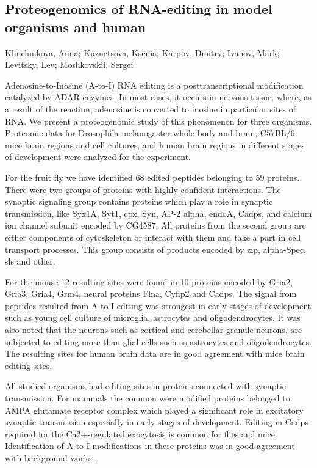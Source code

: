 {\subsection*{\color{eubicRed} Proteogenomics of RNA-editing in model organisms and human}
{\color{eubicGray}Kliuchnikova, Anna;
Kuznetsova, Ksenia;
Karpov, Dmitry;
Ivanov, Mark;
Levitsky, Lev;
Moshkovskii, Sergei}

Adenosine-to-Inosine (A-to-I) RNA editing is a posttranscriptional modification catalyzed by ADAR enzymes. In most cases, it occurs in nervous tissue, where, as a result of the reaction, adenosine is converted to inosine in particular sites of RNA. We present a proteogenomic study of this phenomenon for three organisms. Proteomic data for Drosophila melanogaster whole body and brain, C57BL/6 mice brain regions and cell cultures, and human brain regions in different stages of development were analyzed for the experiment.

For the fruit fly we have identified 68 edited peptides belonging to 59 proteins. There were two groups of proteins with highly confident interactions. The synaptic signaling group contains proteins which play a role in synaptic transmission, like Syx1A, Syt1, cpx, Syn, AP-2 alpha, endoA, Cadps, and calcium ion channel subunit encoded by CG4587. All proteins from the second group are either components of cytoskeleton or interact with them and take a part in cell transport processes. This group consists of products encoded by zip, alpha-Spec, sls and other.

For the mouse 12 resulting sites were found in 10 proteins encoded by Gria2, Gria3, Gria4, Grm4, neural proteins Flna, Cyfip2 and Cadps. The signal from peptides resulted from A-to-I editing was strongest in early stages of development such as young cell culture of microglia, astrocytes and oligodendrocytes. It was also noted that the neurons such as cortical and cerebellar granule neurons, are subjected to editing more than glial cells such as astrocytes and oligodendrocytes. The resulting sites for human brain data are in good agreement with mice brain editing sites.

All studied organisms had editing sites in proteins connected with synaptic transmission. For mammals the common were modified proteins belonged to AMPA glutamate receptor complex which played a significant role in excitatory synaptic transmission especially in early stages of development. Editing in Cadps required for the Ca2+-regulated exocytosis is common for flies and mice. Identification of A-to-I modifications in these proteins was in good agreement with background works.


}
